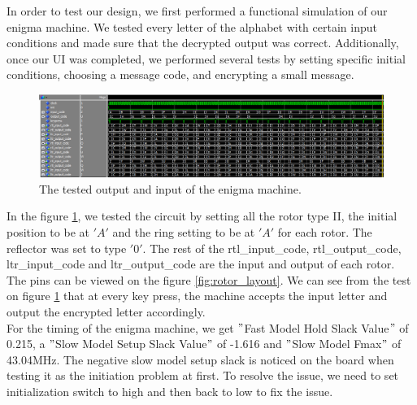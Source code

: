 \documentclass[10pt]{article}
\begin{document}
In order to test our design, we first performed a functional simulation of our enigma machine. We tested every letter of the alphabet with certain input conditions and made sure that the decrypted output was correct. Additionally, once our UI was completed, we performed several tests by setting specific initial conditions, choosing a message code, and encrypting a small message.
\begin{figure}[!htb]
    \centering
    \includegraphics[width=1\textwidth]{./enigma_machine_test.png}
    \caption{The tested output and input of the enigma machine.}
    \label{fig:enigma_machine_test}
\end{figure}
In the figure \ref{fig:enigma_machine_test}, we tested the circuit by setting all the rotor type II, the initial position to be at $'A'$ and the ring setting to be at $'A'$ for each rotor. The reflector was set to type $'0'$. The rest of the rtl\_input\_code, rtl\_output\_code, ltr\_input\_code and ltr\_output\_code are the input and output of each rotor. The pins can be viewed on the figure \ref{fig:rotor_layout}. We can see from the test on figure \ref{fig:enigma_machine_test} that at every key press, the machine accepts the input letter and output the encrypted letter accordingly.\\
\newpage
For the timing of the enigma machine, we get $"$Fast Model Hold Slack Value$"$ of 0.215, a $"$Slow Model Setup Slack Value$"$ of -1.616 and $"$Slow Model Fmax$"$ of 43.04MHz. The negative slow model setup slack is noticed on the board when testing it as the initiation problem at first. To resolve the issue, we need to set initialization switch to high and then back to low to fix the issue.
\end{document}
